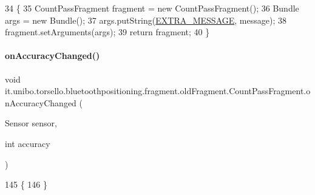 \begin{DoxyCode}
34                                                                 \{
35         CountPassFragment fragment = \textcolor{keyword}{new} CountPassFragment();
36         Bundle args = \textcolor{keyword}{new} Bundle();
37         args.putString(\hyperlink{classit_1_1unibo_1_1torsello_1_1bluetoothpositioning_1_1fragment_1_1oldFragment_1_1CountPassFragment_a5729b3e7bd788b7d1b586938ced085d8_a5729b3e7bd788b7d1b586938ced085d8}{EXTRA\_MESSAGE}, message);
38         fragment.setArguments(args);
39         \textcolor{keywordflow}{return} fragment;
40     \}
\end{DoxyCode}
\hypertarget{classit_1_1unibo_1_1torsello_1_1bluetoothpositioning_1_1fragment_1_1oldFragment_1_1CountPassFragment_a6e43aa183aa10d77db7129375cc9d487_a6e43aa183aa10d77db7129375cc9d487}{}\label{classit_1_1unibo_1_1torsello_1_1bluetoothpositioning_1_1fragment_1_1oldFragment_1_1CountPassFragment_a6e43aa183aa10d77db7129375cc9d487_a6e43aa183aa10d77db7129375cc9d487} 
\paragraph{\texorpdfstring{on\+Accuracy\+Changed()}{onAccuracyChanged()}}
{\footnotesize\ttfamily void it.\+unibo.\+torsello.\+bluetoothpositioning.\+fragment.\+old\+Fragment.\+Count\+Pass\+Fragment.\+on\+Accuracy\+Changed (\begin{DoxyParamCaption}\item[{Sensor}]{sensor,  }\item[{int}]{accuracy }\end{DoxyParamCaption})}


\begin{DoxyCode}
145                                                                \{
146     \}
\end{DoxyCode}
\hypertarget{classit_1_1unibo_1_1torsello_1_1bluetoothpositioning_1_1fragment_1_1oldFragment_1_1CountPassFragment_a4f5121d2c3b4d4efb1b55d753c71a4c4_a4f5121d2c3b4d4efb1b55d753c71a4c4}{}\label{classit_1_1unibo_1_1torsello_1_1bluetoothpositioning_1_1fragment_1_1oldFragment_1_1CountPassFragment_a4f5121d2c3b4d4efb1b55d753c71a4c4_a4f5121d2c3b4d4efb1b55d753c71a4c4} 
